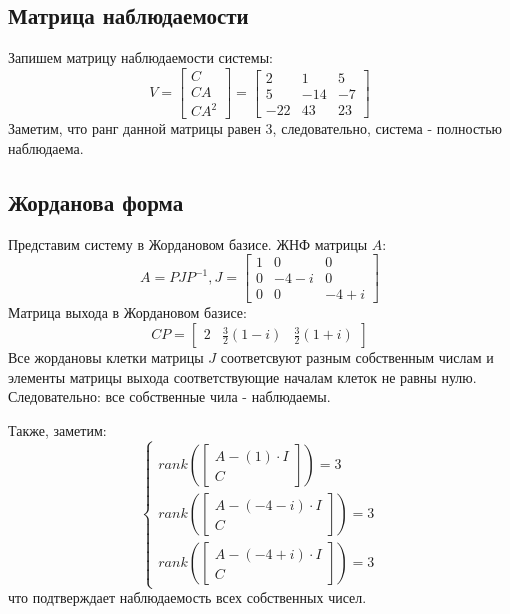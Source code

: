 \subsection{Матрица наблюдаемости}
Запишем матрицу наблюдаемости системы:
\begin{equation*}
    V = \begin{bmatrix}
        C \\ CA \\ CA^2
    \end{bmatrix}
     = 
    \begin{bmatrix}
        2 & 1 & 5 \\
        5 & -14 & -7 \\
        -22 & 43 & 23
    \end{bmatrix}
\end{equation*}
Заметим, что ранг данной матрицы равен 3, следовательно, система - полностью наблюдаема.

\subsection{Жорданова форма}
Представим систему в Жордановом базисе. ЖНФ матрицы $A$:
\begin{equation*}
    A = PJP^{-1},
    J = \begin{bmatrix}
        1 & 0 & 0 \\
        0 & -4-i & 0 \\
        0 & 0 & -4+i
    \end{bmatrix}
\end{equation*}
Матрица выхода в Жордановом базисе:
\begin{equation*}
    CP = \begin{bmatrix}
        2 & \frac{3}{2}(1-i) & \frac{3}{2}(1+i)
    \end{bmatrix}
\end{equation*}
Все жордановы клетки матрицы $J$ соответсвуют разным собственным числам и элементы матрицы выхода
соответствующие началам клеток не равны нулю. Следовательно: все собственные чила - наблюдаемы.

Также, заметим:
\begin{equation*}
    \begin{cases}
        rank(\begin{bmatrix}
            A - (1)\cdot I \\  C
        \end{bmatrix} ) = 3 \\
        rank(\begin{bmatrix}
            A - (-4-i)\cdot I \\ C
        \end{bmatrix} ) = 3 \\
        rank(\begin{bmatrix}
            A - (-4+i)\cdot I \\ C
        \end{bmatrix} ) = 3
    \end{cases}
\end{equation*}
что подтверждает наблюдаемость всех собственных чисел.

